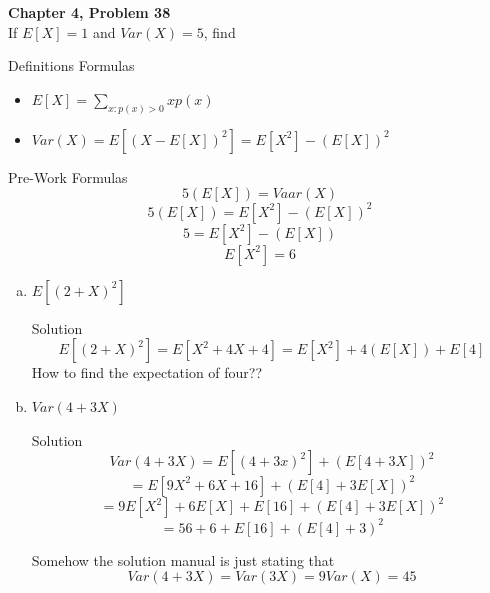 \documentclass{article}
\begin{document}
\begin{spacing}{1.1}
\newpage
\begin{homeworkProblem}
  {\bf Chapter 4, Problem 38}\\
  If $E[ X] = 1$ and $Var( X) = 5$, find 
  \begin{homeworkSection}{Definitions}
    Formulas
      \begin{itemize}
        \item $E[ X] = \sum\limits_{x:p( x) > 0}{ x p( x)}$
        \item $Var( X) = E[ (X - E[ X])^2] = E[ X^2] - (E[ X])^2$
      \end{itemize}
  \end{homeworkSection}
  \begin{homeworkSection}{Pre-Work}
    Formulas
      \[5 (E[ X]) = Vaar( X)\]
      \[5 (E[ X]) = E[ X^2] - (E[ X])^2\]
      \[5 = E[ X^2] - (E[ X])\]
      \[E[ X^2] = 6\]
  \end{homeworkSection}
  \begin{enumerate}[(a)]
    \item $E[ (2 + X)^2]$
      \begin{homeworkSection}{Solution}
        \[E[ (2 + X)^2] = E[ X^2 + 4X + 4] = E[ X^2] + 4 (E[ X]) + E[ 4] \]
        How to find the expectation of four??
      \end{homeworkSection}
    \item $Var( 4 + 3X)$
      \begin{homeworkSection}{Solution}
        \[Var( 4 + 3X) = E[ (4 + 3x)^2] + (E[ 4 + 3X])^2\]
        \[= E[ 9 X^2 + 6 X + 16] + (E[ 4] + 3 E[ X])^2\]
        \[= 9 E[ X^2] + 6 E[ X] + E[ 16] + (E[ 4] + 3 E[ X])^2\]
        \[= 56 + 6 + E[ 16] + (E[ 4] + 3)^2\]

        Somehow the solution manual is just stating that 
        \[Var( 4 + 3X) = Var( 3X) = 9 Var( X) = 45\]

      \end{homeworkSection}
  \end{enumerate}
\end{homeworkProblem}
\end{spacing}
\end{document}
